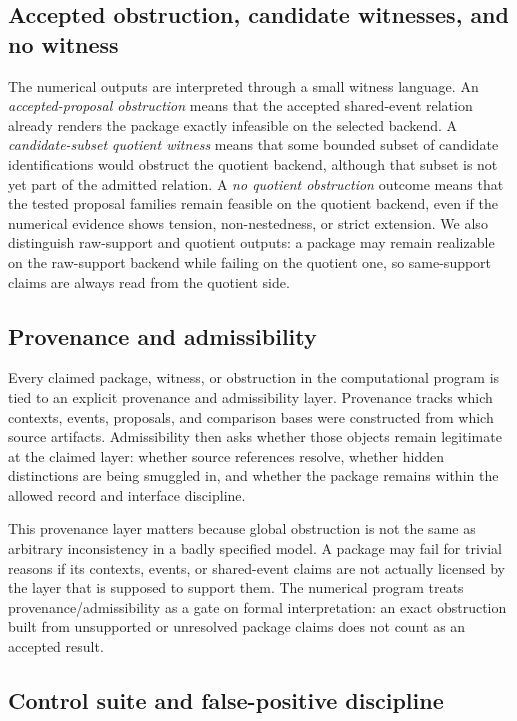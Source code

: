 \documentclass[11pt]{article}
\theoremstyle{definition}
\begin{document}
\subsection{Accepted obstruction, candidate witnesses, and no witness}

The numerical outputs are interpreted through a small witness language. An \emph{accepted-proposal obstruction} means that the accepted shared-event relation already renders the package exactly infeasible on the selected backend. A \emph{candidate-subset quotient witness} means that some bounded subset of candidate identifications would obstruct the quotient backend, although that subset is not yet part of the admitted relation. A \emph{no quotient obstruction} outcome means that the tested proposal families remain feasible on the quotient backend, even if the numerical evidence shows tension, non-nestedness, or strict extension. We also distinguish raw-support and quotient outputs: a package may remain realizable on the raw-support backend while failing on the quotient one, so same-support claims are always read from the quotient side.

\subsection{Provenance and admissibility}

Every claimed package, witness, or obstruction in the computational program is tied to an explicit provenance and admissibility layer. Provenance tracks which contexts, events, proposals, and comparison bases were constructed from which source artifacts. Admissibility then asks whether those objects remain legitimate at the claimed layer: whether source references resolve, whether hidden distinctions are being smuggled in, and whether the package remains within the allowed record and interface discipline.

This provenance layer matters because global obstruction is not the same as arbitrary inconsistency in a badly specified model. A package may fail for trivial reasons if its contexts, events, or shared-event claims are not actually licensed by the layer that is supposed to support them. The numerical program treats provenance/admissibility as a gate on formal interpretation: an exact obstruction built from unsupported or unresolved package claims does not count as an accepted result.

\subsection{Control suite and false-positive discipline}
\end{document}
